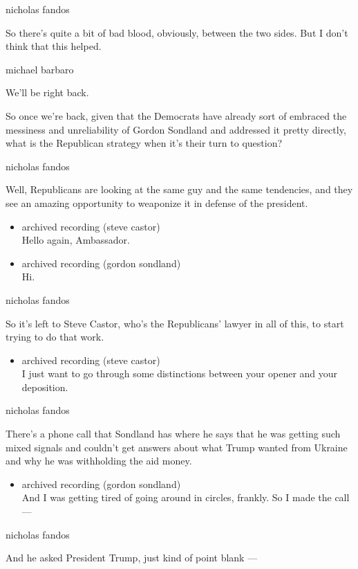 nicholas fandos

So there's quite a bit of bad blood, obviously, between the two sides.
But I don't think that this helped.

michael barbaro

We'll be right back.

So once we're back, given that the Democrats have already sort of
embraced the messiness and unreliability of Gordon Sondland and
addressed it pretty directly, what is the Republican strategy when it's
their turn to question?

nicholas fandos

Well, Republicans are looking at the same guy and the same tendencies,
and they see an amazing opportunity to weaponize it in defense of the
president.

\begin{itemize}
\item
  archived recording (steve castor)\\
  Hello again, Ambassador.
\item
  archived recording (gordon sondland)\\
  Hi.
\end{itemize}

nicholas fandos

So it's left to Steve Castor, who's the Republicans' lawyer in all of
this, to start trying to do that work.

\begin{itemize}
\tightlist
\item
  archived recording (steve castor)\\
  I just want to go through some distinctions between your opener and
  your deposition.
\end{itemize}

nicholas fandos

There's a phone call that Sondland has where he says that he was getting
such mixed signals and couldn't get answers about what Trump wanted from
Ukraine and why he was withholding the aid money.

\begin{itemize}
\tightlist
\item
  archived recording (gordon sondland)\\
  And I was getting tired of going around in circles, frankly. So I made
  the call ---
\end{itemize}

nicholas fandos

And he asked President Trump, just kind of point blank ---


